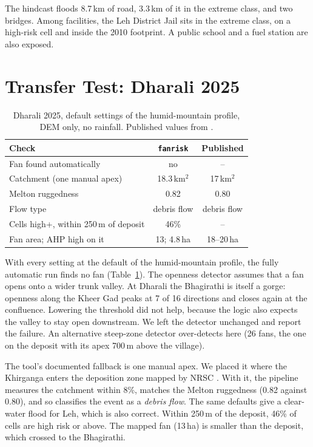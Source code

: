 \documentclass[sigconf,nonacm]{acmart}
\begin{document}
The hindcast floods 8.7\,km of road, 3.3\,km of it in the extreme class, and two bridges. Among facilities, the Leh District Jail sits in the extreme class, on a high-risk cell and inside the 2010 footprint. A public school and a fuel station are also exposed.

\section{Transfer Test: Dharali 2025}\label{sec:dharali}
\begin{table}[t]
  \caption{Dharali 2025, default settings of the humid-mountain profile, DEM only, no rainfall. Published values from \cite{kumar2026,isro2025}.}
  \label{tab:dharali}
  \small
  \begin{tabular}{@{}p{}cc@{}}
    \toprule
    Check & \texttt{fanrisk} & Published \\
    \midrule
    Fan found automatically & no & -- \\
    Catchment (one manual apex) & 18.3\,km$^2$ & 17\,km$^2$ \\
    Melton ruggedness & 0.82 & 0.80 \\
    Flow type & debris flow & debris flow \\
    Cells high+, within 250\,m of deposit & 46\% & -- \\
    Fan area; AHP high on it & 13; 4.8\,ha & 18--20\,ha \\
    \bottomrule
  \end{tabular}
\end{table}
With every setting at the default of the humid-mountain profile, the fully automatic run finds no fan (Table~\ref{tab:dharali}). The openness detector assumes that a fan opens onto a wider trunk valley. At Dharali the Bhagirathi is itself a gorge: openness along the Kheer Gad peaks at 7 of 16 directions and closes again at the confluence. Lowering the threshold did not help, because the logic also expects the valley to stay open downstream. We left the detector unchanged and report the failure. An alternative steep-zone detector \cite{norini2016} over-detects here (26 fans, the one on the deposit with its apex 700\,m above the village).

The tool's documented fallback is one manual apex. We placed it where the Khirganga enters the deposition zone mapped by NRSC \cite{nrsc2025}. With it, the pipeline measures the catchment within 8\%, matches the Melton ruggedness (0.82 against 0.80), and so classifies the event as a \emph{debris flow}. The same defaults give a clear-water flood for Leh, which is also correct. Within 250\,m of the deposit, 46\% of cells are high risk or above. The mapped fan (13\,ha) is smaller than the deposit, which crossed to the Bhagirathi.
\end{document}
